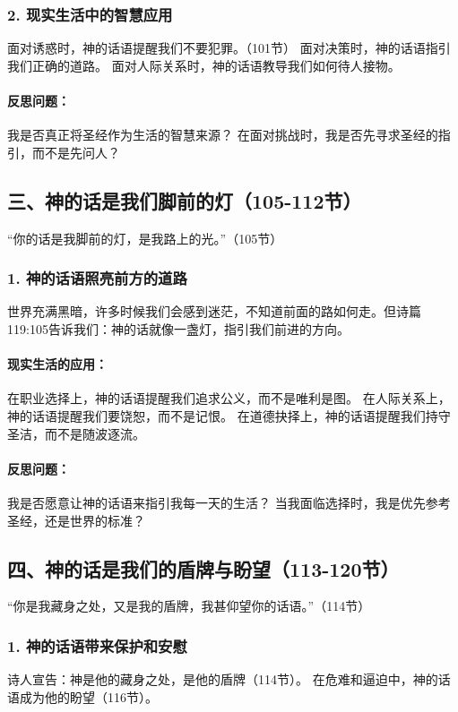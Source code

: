 \documentclass[a4paper, 12pt]{article}
\begin{document}
\subsubsection*{2. 现实生活中的智慧应用}
面对诱惑时，神的话语提醒我们不要犯罪。（101节）
面对决策时，神的话语指引我们正确的道路。
面对人际关系时，神的话语教导我们如何待人接物。
\paragraph*{反思问题：}

我是否真正将圣经作为生活的智慧来源？
在面对挑战时，我是否先寻求圣经的指引，而不是先问人？
\subsection*{三、神的话是我们脚前的灯（105-112节）}
“你的话是我脚前的灯，是我路上的光。”（105节）

\subsubsection*{1. 神的话语照亮前方的道路}
世界充满黑暗，许多时候我们会感到迷茫，不知道前面的路如何走。但诗篇119:105告诉我们：神的话就像一盏灯，指引我们前进的方向。

\paragraph*{现实生活的应用：}

在职业选择上，神的话语提醒我们追求公义，而不是唯利是图。
在人际关系上，神的话语提醒我们要饶恕，而不是记恨。
在道德抉择上，神的话语提醒我们持守圣洁，而不是随波逐流。
\paragraph*{反思问题：}

我是否愿意让神的话语来指引我每一天的生活？
当我面临选择时，我是优先参考圣经，还是世界的标准？
\subsection*{四、神的话是我们的盾牌与盼望（113-120节）}
“你是我藏身之处，又是我的盾牌，我甚仰望你的话语。”（114节）

\subsubsection*{1. 神的话语带来保护和安慰}
诗人宣告：神是他的藏身之处，是他的盾牌（114节）。
在危难和逼迫中，神的话语成为他的盼望（116节）。
\end{document}
